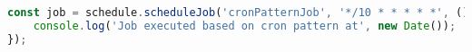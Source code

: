 \begin{lstlisting}[language=Javascript,caption={Penjadwalan dengan Pola Cron}]
const job = schedule.scheduleJob('cronPatternJob', '*/10 * * * * *', () => {
    console.log('Job executed based on cron pattern at', new Date());
});
\end{lstlisting}